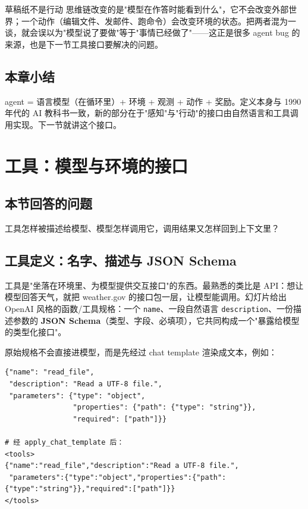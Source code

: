 \documentclass[a4paper]{article}
\begin{document}
\begin{knowledgebox}{草稿纸不是行动}
思维链改变的是"模型在作答时能看到什么"，它不会改变外部世界；一个动作（编辑文件、发邮件、跑命令）会改变环境的状态。把两者混为一谈，就会误以为"模型说了要做"等于"事情已经做了"——这正是很多 agent bug 的来源，也是下一节工具接口要解决的问题。
\end{knowledgebox}

\subsection{本章小结}
agent = 语言模型（在循环里）+ 环境 + 观测 + 动作 + 奖励。定义本身与 1990 年代的 AI 教科书一致，新的部分在于"感知"与"行动"的接口由自然语言和工具调用实现。下一节就讲这个接口。

\section{工具：模型与环境的接口}

\subsection*{本节回答的问题}
工具怎样被描述给模型、模型怎样调用它，调用结果又怎样回到上下文里？

\subsection{工具定义：名字、描述与 JSON Schema}

工具是"坐落在环境里、为模型提供交互接口"的东西。最熟悉的类比是 API：想让模型回答天气，就把 weather.gov 的接口包一层，让模型能调用。幻灯片给出 OpenAI 风格的函数/工具规格：一个 \texttt{name}、一段自然语言 \texttt{description}、一份描述参数的 \textbf{JSON Schema}（类型、字段、必填项），它共同构成一个"暴露给模型的类型化接口"。

原始规格不会直接进模型，而是先经过 chat template 渲染成文本，例如：

\begin{lstlisting}[caption=工具规格的 JSON 形态与 chat template 渲染（幻灯片示例）]
{"name": "read_file",
 "description": "Read a UTF-8 file.",
 "parameters": {"type": "object",
                "properties": {"path": {"type": "string"}},
                "required": ["path"]}}

# 经 apply_chat_template 后：
<tools>
{"name":"read_file","description":"Read a UTF-8 file.",
 "parameters":{"type":"object","properties":{"path":{"type":"string"}},"required":["path"]}}
</tools>
\end{lstlisting}
\end{document}
